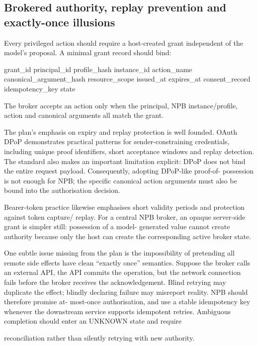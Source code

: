 \documentclass[11pt,a4paper]{article}
\begin{document}
\subsection*{Brokered authority, replay prevention and exactly-once illusions}
Every privileged action should require a host-created grant independent of the model's proposal. A minimal grant record should bind:\par
grant\_id principal\_id profile\_hash instance\_id action\_name canonical\_argument\_hash resource\_scope issued\_at expires\_at consent\_record idempotency\_key state\par
The broker accepts an action only when the principal, NPB instance/profile, action and canonical arguments all match the grant.\par
The plan's emphasis on expiry and replay protection is well founded. OAuth DPoP demonstrates practical patterns for sender-constraining credentials, including unique proof identifiers, short acceptance windows and replay detection. The standard also makes an important limitation explicit: DPoP does not bind the entire request payload. Consequently, adopting DPoP-like proof-of- possession is not enough for NPB; the specific canonical action arguments must also be bound into the authorisation decision.\par
Bearer-token practice likewise emphasises short validity periods and protection against token capture/ replay. For a central NPB broker, an opaque server-side grant is simpler still: possession of a model- generated value cannot create authority because only the host can create the corresponding active broker state.\par
One subtle issue missing from the plan is the impossibility of pretending all remote side effects have clean “exactly once” semantics. Suppose the broker calls an external API, the API commits the operation, but the network connection fails before the broker receives the acknowledgement. Blind retrying may duplicate the effect; blindly declaring failure may misreport reality. NPB should therefore promise at- most-once authorisation, and use a stable idempotency key whenever the downstream service supports idempotent retries. Ambiguous completion should enter an UNKNOWN  state and require\par
reconciliation rather than silently retrying with new authority.\par
\end{document}
